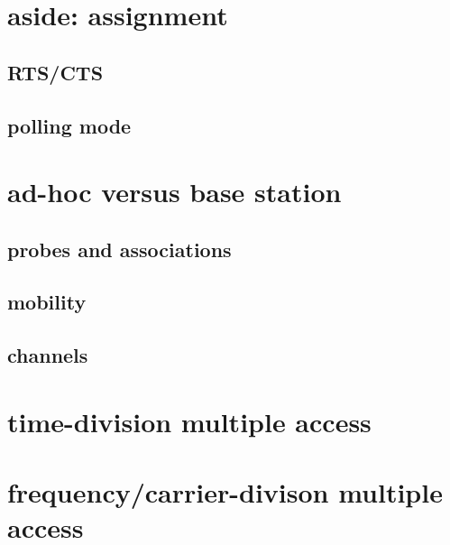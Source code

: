 
\section{aside: assignment}

\subsection{RTS/CTS}

\subsection{polling mode}

\section{ad-hoc versus base station}

\subsection{probes and associations}

\subsection{mobility}

\subsection{channels}

\section{time-division multiple access}

\section{frequency/carrier-divison multiple access}

